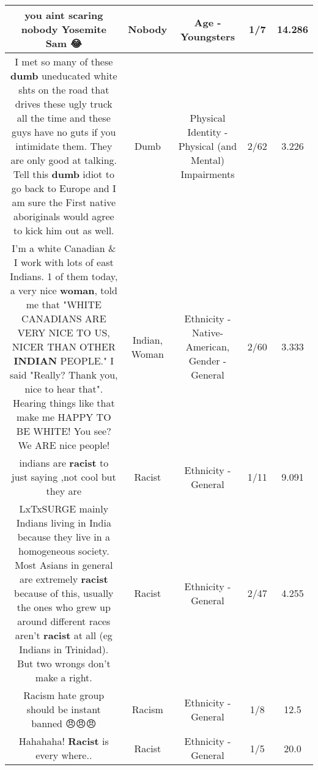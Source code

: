 \documentclass[11pt]{article}
\newlength\mylength
\begin{document}
\begin{center}
\begin{longtable}{|C{.65\mylength}|C{.30\mylength}|C{.12\mylength}|C{.12\mylength}|C{.12\mylength}|}
  \small you aint scaring \textbf{nobody} Yosemite Sam 😂\normalsize   & Nobody & Age - Youngsters & 1/7 & 14.286 \\  \hline
  \small I met so many of these \textbf{dumb} uneducated white shts on the road that drives these ugly truck all the time and these guys have no guts if you intimidate them. They are only good at talking. Tell this \textbf{dumb} idiot to go back to Europe and I am sure the First native aboriginals would agree to kick him out as well.\normalsize   & Dumb & Physical Identity - Physical (and Mental) Impairments & 2/62 & 3.226 \\  \hline
  \small I'm a white Canadian \& I work with lots of east Indians. 1 of them today, a very nice \textbf{woman}, told me that "WHITE CANADIANS ARE VERY NICE TO US, NICER THAN OTHER \textbf{INDIAN} PEOPLE." I said "Really? Thank you, nice to hear that". Hearing things like that make me HAPPY TO BE WHITE! You see? We ARE nice people!\normalsize   & Indian, Woman & Ethnicity - Native-American, Gender - General & 2/60 & 3.333 \\  \hline
  \small indians are \textbf{racist} to just saying ,not cool but they are\normalsize   & Racist & Ethnicity - General & 1/11 & 9.091 \\  \hline
  \small LxTxSURGE mainly Indians living in India because they live in a homogeneous society. Most Asians in general are extremely \textbf{racist} because of this, usually the ones who grew up around different races aren't \textbf{racist} at all (eg Indians in Trinidad). But two wrongs don't make a right.\normalsize   & Racist & Ethnicity - General & 2/47 & 4.255 \\  \hline
  \small Racism hate group should be instant  banned 😠😠😠\normalsize   & Racism & Ethnicity - General & 1/8 & 12.5 \\  \hline
  \small Hahahaha! \textbf{Racist} is every where..\normalsize   & Racist & Ethnicity - General & 1/5 & 20.0 \\  \hline

\end{longtable}
\end{center}
\end{document}
